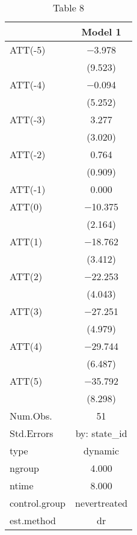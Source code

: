 \begin{table}

\caption{Table 8}
\centering
\begin{tabular}[t]{lc}
\toprule
  & Model 1\\
\midrule
ATT(-5) & \num{-3.978}\\
 & (\num{9.523})\\
ATT(-4) & \num{-0.094}\\
 & (\num{5.252})\\
ATT(-3) & \num{3.277}\\
 & (\num{3.020})\\
ATT(-2) & \num{0.764}\\
 & (\num{0.909})\\
ATT(-1) & \num{0.000}\\
ATT(0) & \num{-10.375}\\
 & (\num{2.164})\\
ATT(1) & \num{-18.762}\\
 & (\num{3.412})\\
ATT(2) & \num{-22.253}\\
 & (\num{4.043})\\
ATT(3) & \num{-27.251}\\
 & (\num{4.979})\\
ATT(4) & \num{-29.744}\\
 & (\num{6.487})\\
ATT(5) & \num{-35.792}\\
 & (\num{8.298})\\
\midrule
Num.Obs. & \num{51}\\
Std.Errors & by: state\_id\\
type & dynamic\\
ngroup & \num{4.000}\\
ntime & \num{8.000}\\
control.group & nevertreated\\
est.method & dr\\
\bottomrule
\end{tabular}
\end{table}
